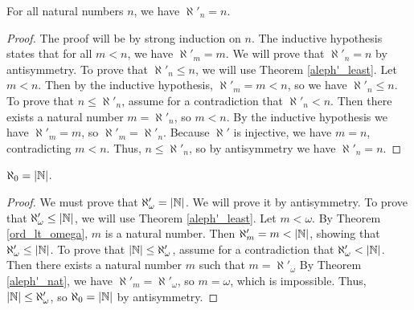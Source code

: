 \documentclass[../../math.tex]{subfiles}
\begin{document}
\begin{theorem} \label{aleph'_nat}
    For all natural numbers $n$, we have $\aleph'_n = n$.
\end{theorem}
\begin{proof}
    The proof will be by strong induction on $n$.  The inductive hypothesis
    states that for all $m < n$, we have $\aleph'_m = m$.  We will prove that
    $\aleph'_n = n$ by antisymmetry.  To prove that $\aleph'_n \leq n$, we will
    use Theorem \ref{aleph'_least}.  Let $m < n$.  Then by the inductive
    hypothesis, $\aleph'_m = m < n$, so we have $\aleph'_n \leq n$.  To prove
    that $n \leq \aleph'_n$, assume for a contradiction that $\aleph'_n < n$.
    Then there exists a natural number $m = \aleph'_n$, so $m < n$.  By the
    inductive hypothesis we have $\aleph'_m = m$, so $\aleph'_m = \aleph'_n$.
    Because $\aleph'$ is injective, we have $m = n$, contradicting $m < n$.
    Thus, $n \leq \aleph'_n$, so by antisymmetry we have $\aleph'_n = n$.
\end{proof}

\begin{theorem} \label{aleph_0}
    $\aleph_0 = |\mathbb{N}|$.
\end{theorem}
\begin{proof}
    We must prove that $\aleph'_\omega = |\mathbb{N}|$.  We will prove it by
    antisymmetry.  To prove that $\aleph'_\omega \leq |\mathbb{N}|$, we will use Theorem
    \ref{aleph'_least}.  Let $m < \omega$.  By Theorem \ref{ord_lt_omega}, $m$
    is a natural number.  Then $\aleph'_m = m < |\mathbb{N}|$, showing that
    $\aleph'_\omega \leq |\mathbb{N}|$.  To prove that $|\mathbb{N}| \leq \aleph'_\omega$,
    assume for a contradiction that $\aleph'_\omega < |\mathbb{N}|$.  Then there exists
    a natural number $m$ such that $m = \aleph'_\omega$  By Theorem
    \ref{aleph'_nat}, we have $\aleph'_m = \aleph'_\omega$, so $m = \omega$,
    which is impossible.  Thus, $|\mathbb{N}| \leq \aleph'_\omega$, so $\aleph_0 = |\mathbb{N}|$
    by antisymmetry.
\end{proof}
\end{document}

